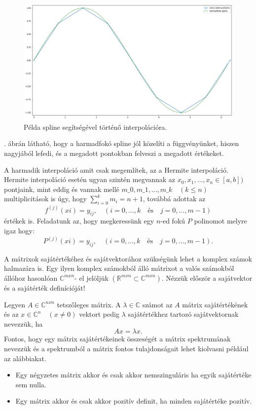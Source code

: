 \begin{figure}[h!]
\centering
\includegraphics[width=\textwidth]{img/spline.png}
\caption{Példa spline segítségével történő interpolációra.}
\label{fig:spline}
\end{figure}

. ábrán látható, hogy a harmadfokó spline jól közelíti a függvényünket, hiszen
nagyjából lefedi, és a megadott pontokban felveszi a megadott
értékeket.


    A harmadik interpoláció amit csak megemlítek, az a Hermite interpoláció.
Hermite interpoláció esetén ugyan szintén megvannak az
\(x_0, x_1, \dots, x_n \in [a,b])\) pontjaink, mint eddig és vannak
mellé $m\_0, m\_1, \dots, m\_k \quad (k\leq n)$ multiplicitások is
úgy, hogy $\sum_{i=0}^k m_i=n+1$, továbbá adottak az
\[
f^{(j)}(xi)=y_{ij}, \quad (i=0,\dots,k \quad \textrm{és}\quad j=0,\dots,m-1)
\]
értékek is. Feladatunk az, hogy megkeressünk egy $n$-ed fokú $P$ polinomot
melyre igaz hogy:
\[
P^{(j)}(xi)=y_{ij}, \quad (i=0,\dots,k \quad\textrm{és}\quad j=0,\dots,m-1).
\]


    A mátrixok sajátértékéhez és sajátvektorához szükségünk lehet a komplex
számok halmazára is. Egy ilyen komplex számokból álló mátrixot a valós
számokból állóhoz hasonlóan \(\mathbb{C}^{mxn}\)- el jelöljük
\((\mathbb{R}^{mxn} \subset \mathbb{C}^{mxn})\). Nézzük először a
sajátvektor és a sajátérték definícióját!

Legyen \(A \in \mathbb{C}^{nxn}\) tetszőleges mátrix. A
\(\lambda \in \mathbb{C}\) számot az \(A\) mátrix sajátértékének és az
\(x \in \mathbb{C}^n \quad (x\neq0)\) vektort pedig \(\lambda\)
sajátértékhez tartozó sajátvektornak nevezzük, ha
\[
Ax=\lambda x.
\]
    Fontos, hogy egy mátrix sajátértékeinek összeségét a mátrix spektrumának
nevezzük és a spektrumból a mátrix fontos tulajdonságait lehet kiolvasni
például az alábbiakat.
\begin{itemize}
\item Egy négyzetes mátrix akkor és csak akkor nemszinguláris ha
egyik sajátértéke sem nulla.
\item Egy mátrix akkor és csak akkor pozitív
definit, ha minden sajátértéke pozitív.
\end{itemize}

